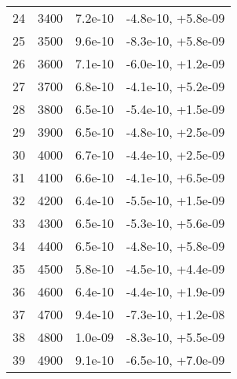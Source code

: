 \begin{table}
\begin{adjustbox}{width=1\textwidth/2}
\begin{tabular}{|c|c|c|c|}
\cline{1-4}
24 & 3400 & 7.2e-10 & -4.8e-10, +5.8e-09 \\
\cline{1-4}
25 & 3500 & 9.6e-10 & -8.3e-10, +5.8e-09 \\
\cline{1-4}
26 & 3600 & 7.1e-10 & -6.0e-10, +1.2e-09 \\
\cline{1-4}
27 & 3700 & 6.8e-10 & -4.1e-10, +5.2e-09 \\
\cline{1-4}
28 & 3800 & 6.5e-10 & -5.4e-10, +1.5e-09 \\
\cline{1-4}
29 & 3900 & 6.5e-10 & -4.8e-10, +2.5e-09 \\
\cline{1-4}
30 & 4000 & 6.7e-10 & -4.4e-10, +2.5e-09 \\
\cline{1-4}
31 & 4100 & 6.6e-10 & -4.1e-10, +6.5e-09 \\
\cline{1-4}
32 & 4200 & 6.4e-10 & -5.5e-10, +1.5e-09 \\
\cline{1-4}
33 & 4300 & 6.5e-10 & -5.3e-10, +5.6e-09 \\
\cline{1-4}
34 & 4400 & 6.5e-10 & -4.8e-10, +5.8e-09 \\
\cline{1-4}
35 & 4500 & 5.8e-10 & -4.5e-10, +4.4e-09 \\
\cline{1-4}
36 & 4600 & 6.4e-10 & -4.4e-10, +1.9e-09 \\
\cline{1-4}
37 & 4700 & 9.4e-10 & -7.3e-10, +1.2e-08 \\
\cline{1-4}
38 & 4800 & 1.0e-09 & -8.3e-10, +5.5e-09 \\
\cline{1-4}
39 & 4900 & 9.1e-10 & -6.5e-10, +7.0e-09 \\
\cline{1-4}
\end{tabular}
\end{adjustbox}
\end{table}

